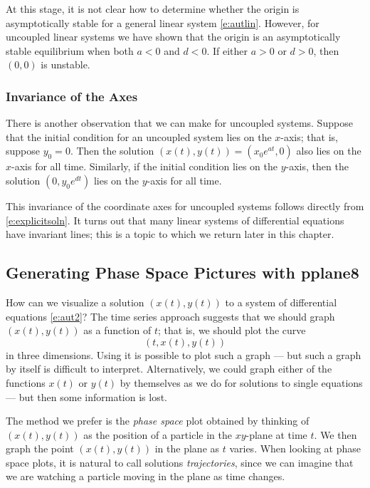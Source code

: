 \documentclass{ximera}
\begin{document}
At this stage, it is not clear how to determine whether the
origin is asymptotically stable for a general linear system
\eqref{e:autlin}.  However, for uncoupled linear systems we
have shown that the origin is an asymptotically stable
equilibrium when both $a < 0$ and $d < 0$.  If either
$a >0$ or $d > 0$, then $(0,0)$ is unstable.

\subsubsection*{Invariance of the Axes}

There is another observation that we can make
for uncoupled systems.  Suppose that the initial condition for
an uncoupled system lies on the $x$-axis; that is, suppose $y_0=0$.
Then the solution $(x(t),y(t))=(x_0e^{at},0)$ also lies on the
$x$-axis for all time.  Similarly, if the initial condition lies
on the $y$-axis, then the solution $(0,y_0e^{dt})$ lies on the
$y$-axis for all time.

This invariance of the coordinate axes for uncoupled systems
follows directly from \eqref{e:explicitsoln}.  It turns out that
many linear systems of differential equations have invariant
lines; this is a topic to which we return later in this chapter.

\subsection*{Generating Phase Space Pictures with {\sf pplane8}}

How can we visualize a solution $(x(t),y(t))$ to a system of
differential equations \eqref{e:aut2}?  The time series approach
suggests that we should graph $(x(t),y(t))$ as a function of $t$;
that is, we should plot the curve
\[
(t,x(t),y(t))
\]
in three dimensions.  Using \Matlab it is
possible to plot such a graph --- but such a graph by itself is
difficult to interpret.  Alternatively, we could graph either of
the functions $x(t)$ or $y(t)$ by themselves as we do for
solutions to single equations --- but then some information is
lost.

The method we prefer is the {\em phase space\/} 
plot obtained by thinking of $(x(t),y(t))$ as the
position of a particle in the $xy$-plane at time $t$.  We then
graph the point $(x(t),y(t))$ in the plane as $t$ varies.  When
looking at phase space plots, it is natural to call solutions
{\em trajectories\/}, since we can imagine
that we are watching a particle moving in the plane as time
changes.
\end{document}
